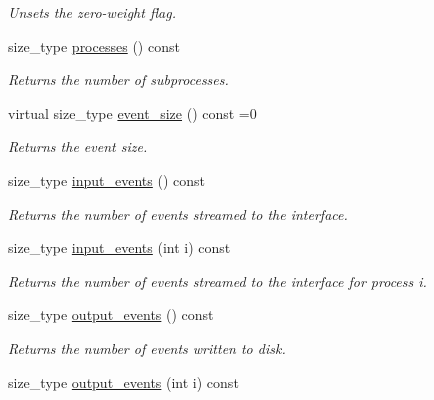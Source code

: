 \begin{DoxyCompactItemize}
\begin{DoxyCompactList}\small\item\em Unsets the zero-\/weight flag. \end{DoxyCompactList}\item 
\hypertarget{a00313_ae6db905736d66092b9dcf8120c6e935e}{size\-\_\-type \hyperlink{a00313_ae6db905736d66092b9dcf8120c6e935e}{processes} () const }\label{a00313_ae6db905736d66092b9dcf8120c6e935e}

\begin{DoxyCompactList}\small\item\em Returns the number of subprocesses. \end{DoxyCompactList}\item 
\hypertarget{a00313_ac6c0df9fb86662d54e3b4f903a8eb831}{virtual size\-\_\-type \hyperlink{a00313_ac6c0df9fb86662d54e3b4f903a8eb831}{event\-\_\-size} () const =0}\label{a00313_ac6c0df9fb86662d54e3b4f903a8eb831}

\begin{DoxyCompactList}\small\item\em Returns the event size. \end{DoxyCompactList}\item 
\hypertarget{a00313_a83647b85147e31455f2781ad3111849e}{size\-\_\-type \hyperlink{a00313_a83647b85147e31455f2781ad3111849e}{input\-\_\-events} () const }\label{a00313_a83647b85147e31455f2781ad3111849e}

\begin{DoxyCompactList}\small\item\em Returns the number of events streamed to the interface. \end{DoxyCompactList}\item 
\hypertarget{a00313_a4be24bd2d607368c9bb95282e3d7613a}{size\-\_\-type \hyperlink{a00313_a4be24bd2d607368c9bb95282e3d7613a}{input\-\_\-events} (int i) const }\label{a00313_a4be24bd2d607368c9bb95282e3d7613a}

\begin{DoxyCompactList}\small\item\em Returns the number of events streamed to the interface for process i. \end{DoxyCompactList}\item 
\hypertarget{a00313_a3c75abe5cfc8dc7fe822006dfd860dc2}{size\-\_\-type \hyperlink{a00313_a3c75abe5cfc8dc7fe822006dfd860dc2}{output\-\_\-events} () const }\label{a00313_a3c75abe5cfc8dc7fe822006dfd860dc2}

\begin{DoxyCompactList}\small\item\em Returns the number of events written to disk. \end{DoxyCompactList}\item 
\hypertarget{a00313_a61c0d694fb6f316c47c4d4aa33c4a452}{size\-\_\-type \hyperlink{a00313_a61c0d694fb6f316c47c4d4aa33c4a452}{output\-\_\-events} (int i) const }\label{a00313_a61c0d694fb6f316c47c4d4aa33c4a452}


\end{DoxyCompactItemize}
